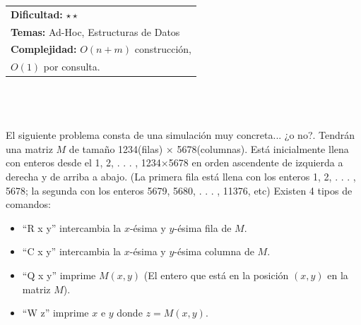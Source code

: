 \documentclass[12pt]{article}
\begin{document}
\hfill
\begin{tabular}{@{}l@{}}
\textbf{Dificultad:} $\star \star$ \\
\textbf{Temas:} Ad-Hoc, Estructuras de Datos\\
\textbf{Complejidad:} $O(n+m)$ construcción,\\ $O(1)$ por consulta.\\
\end{tabular}\\
\\
\\El siguiente problema consta de una simulación muy concreta... ¿o no?. Tendrán una matriz $M$ de tamaño 1234(filas) × 5678(columnas). Está inicialmente llena con enteros desde el 1, 2, . . . , 1234×5678 en orden ascendente de izquierda a derecha y de arriba a abajo. (La primera fila está llena con los enteros 1, 2, . . . , 5678; la segunda
con los enteros 5679, 5680, . . . , 11376, etc) Existen 4 tipos de comandos:\\
\begin{itemize}
\item “R x y” intercambia la $x$-ésima y $y$-ésima fila de $M$.
\item “C x y” intercambia la $x$-ésima y $y$-ésima columna de $M$.
\item “Q x y” imprime $M(x, y)$ (El entero que está en la posición $(x,y)$ en la matriz $M$).
\item “W z” imprime $x$ e $y$ donde $z = M(x, y)$.
\end{itemize}
\end{document}
